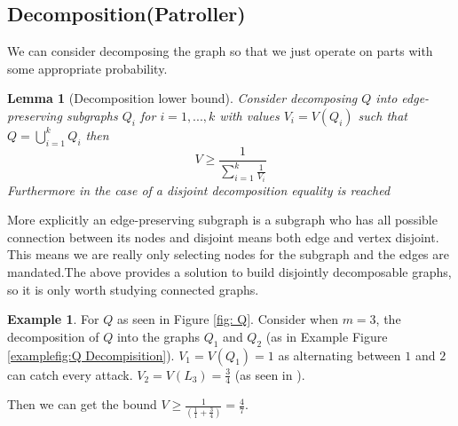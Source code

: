 \documentclass[a4paper,10pt]{article}
\newtheorem{lemma}[theorem]{Lemma}
\theoremstyle{definition}
\theoremstyle{definition}
\newtheorem{example}[theorem]{Example}
\theoremstyle{remark}
\theoremstyle{definition}
\begin{document}
\subsection{Decomposition(Patroller)}
We can consider decomposing the graph so that we just operate on parts with some appropriate probability.

\begin{lemma}[Decomposition lower bound]
Consider decomposing $Q$ into edge-preserving subgraphs $Q_{i}$ for $i=1,...,k$ with values $V_{i}=V(Q_{i})$ such that $Q=\bigcup\limits_{i=1}^{k} Q_{i}$ then
$$V \geq \frac{1}{\sum\limits_{i=1}^{k} \frac{1}{V_{i}}} $$
Furthermore in the case of a disjoint decomposition equality is reached
\end{lemma}

More explicitly an edge-preserving subgraph is a subgraph who has all possible connection between its nodes and disjoint means both edge and vertex disjoint. This means we are really only selecting nodes for the subgraph and the edges are mandated.The above provides a solution to build disjointly decomposable graphs, so it is only worth studying connected graphs.


\begin{example}
For $Q$ as seen in Figure \ref{fig: Q}. Consider when $m=3$, the decomposition of $Q$ into the graphs $Q_{1}$ and $Q_{2}$ (as in Example Figure \ref{examplefig:Q Decompisition}). $V_{1}=V(Q_{1})=1$ as alternating between $1$ and $2$ can catch every attack. $V_{2}=V(L_{3})=\frac{3}{4}$ (as seen in \cite{Alpern2011} ). 

Then we can get the bound $V \geq \frac{1}{(\frac{1}{1}+\frac{3}{4})}=\frac{4}{7}$.
\end{example}

\begin{myfigure}
\begin{center}
\end{center}
\caption{Decomposition of Q into \textcolor{blue}{$Q_{1}$} and \textcolor{red}{$Q_{2}$}.}
\label{examplefig:Q Decompisition}
\end{myfigure}
\end{document}
